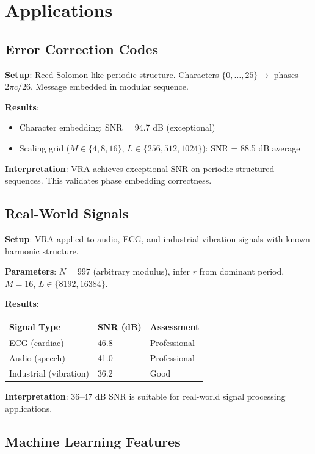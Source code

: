 \documentclass[10pt,twocolumn]{article}
\begin{document}
\section{Applications}

\subsection{Error Correction Codes}

\textbf{Setup}: Reed-Solomon-like periodic structure. Characters $\{0, \ldots, 25\} \to$ phases $2\pi c/26$. Message embedded in modular sequence.

\textbf{Results}:
\begin{itemize}
\item Character embedding: SNR = 94.7 dB (exceptional)
\item Scaling grid ($M \in \{4, 8, 16\}$, $L \in \{256, 512, 1024\}$): SNR = 88.5 dB average
\end{itemize}

\textbf{Interpretation}: VRA achieves exceptional SNR on periodic structured sequences. This validates phase embedding correctness.

\subsection{Real-World Signals}

\textbf{Setup}: VRA applied to audio, ECG, and industrial vibration signals with known harmonic structure.

\textbf{Parameters}: $N = 997$ (arbitrary modulus), infer $r$ from dominant period, $M = 16$, $L \in \{8192, 16384\}$.

\textbf{Results}:
\begin{center}
\begin{tabular}{lll}
\toprule
Signal Type & SNR (dB) & Assessment \\
\midrule
ECG (cardiac) & 46.8 & Professional \\
Audio (speech) & 41.0 & Professional \\
Industrial (vibration) & 36.2 & Good \\
\bottomrule
\end{tabular}
\end{center}

\textbf{Interpretation}: 36--47 dB SNR is suitable for real-world signal processing applications.

\subsection{Machine Learning Features}
\end{document}
